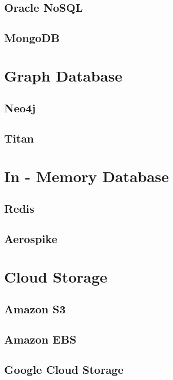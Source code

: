 \subsection{Oracle NoSQL}
\subsection{MongoDB}

\section{Graph Database}

\subsection{Neo4j}
\subsection{Titan}







\section{In - Memory Database}

\subsection{Redis}
\subsection{Aerospike}

\section{Cloud Storage}

\subsection{Amazon S3}
\subsection{Amazon EBS}
\subsection{Google Cloud Storage}